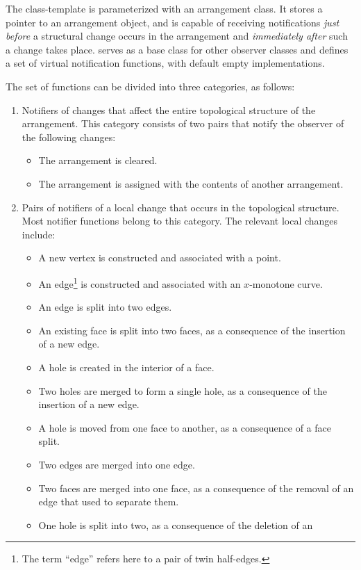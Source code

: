 The  class-template is
parameterized with an arrangement class. It stores a pointer to an
arrangement object, and is capable of receiving notifications {\em
just before} a structural change occurs in the arrangement and
{\em immediately after} such a change takes place.
 serves as a base class for other observer
classes and defines a set of virtual notification functions,
with default empty implementations.

The set of functions can be divided into three categories, as
follows:
\begin{enumerate}
\item Notifiers of changes that affect the entire topological structure
of the arrangement. This category consists of two pairs that
notify the observer of the following changes:
\begin{itemize}
\item The arrangement is cleared.
\item The arrangement is assigned with the contents of another
arrangement.
\end{itemize}
\item Pairs of notifiers of a local change that occurs in the
topological structure. Most notifier functions belong to this
category. The relevant local changes include:
\begin{itemize}
\item A new vertex is constructed and associated with a point.
\item An edge\footnote{The term ``edge'' refers here to a pair of twin
half-edges.} is constructed and associated with an $x$-monotone
curve.
\item An edge is split into two edges.
\item An existing face is split into two faces, as a consequence of the
insertion of a new edge.
\item A hole is created in the interior of a face.
\item Two holes are merged to form a single hole, as a consequence of the
insertion of a new edge.
\item A hole is moved from one face to another, as a consequence of
a face split.
\item Two edges are merged into one edge.
\item Two faces are merged into one face, as a consequence of the
removal of an edge that used to separate them.
\item One hole is split into two, as a consequence of the deletion of an 

\end{itemize}
\end{enumerate}
